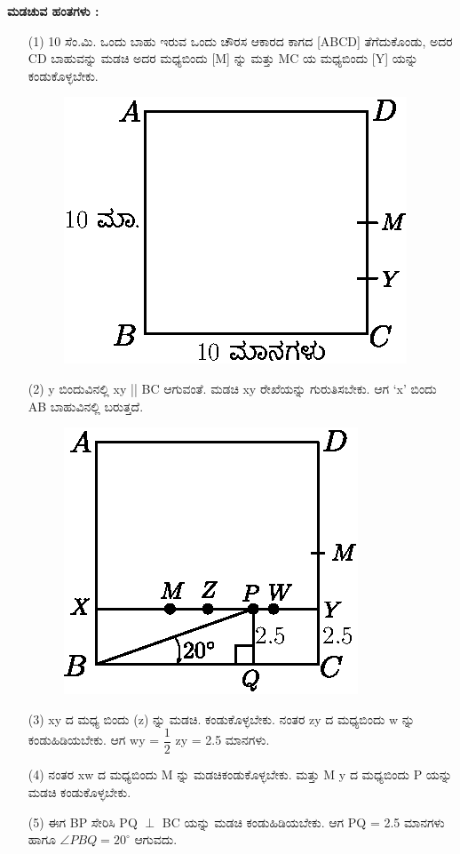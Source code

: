 \noindent
\textbf{ಮಡಚುವ ಹಂತಗಳು :}
\begin{enumerate}
\item[(1)] 10 ಸೆಂ.ಮಿ. ಒಂದು ಬಾಹು ಇರುವ ಒಂದು ಚೌರಸ ಆಕಾರದ ಕಾಗದ  [ABCD] ತೆಗೆದುಕೊಂಡು, ಅದರ CD ಬಾಹುವನ್ನು ಮಡಚಿ ಅದರ ಮಧ್ಯಬಿಂದು [M] ನ್ನು ಮತ್ತು MC ಯ ಮಧ್ಯಬಿಂದು [Y] ಯನ್ನು ಕಂಡುಕೊಳ್ಳಬೇಕು. 
\begin{figure}[H]
\centering
\includegraphics[scale=.9]{src/figure/chap1/fig1-14a.eps}
\end{figure}

\item[(2)] y ಬಿಂದುವಿನಲ್ಲಿ  xy || BC ಆಗುವಂತೆ. ಮಡಚಿ xy ರೇಖೆಯನ್ನು ಗುರುತಿಸಬೇಕು. ಆಗ `x' ಬಿಂದು AB ಬಾಹುವಿನಲ್ಲಿ ಬರುತ್ತದೆ. 
\begin{figure}[H]
\centering
\includegraphics[scale=.9]{src/figure/chap1/fig1-14b.eps}
\end{figure}

\item[(3)] xy ದ ಮಧ್ಯ ಬಿಂದು (z) ನ್ನು ಮಡಚಿ. ಕಂಡುಕೊಳ್ಳಬೇಕು. ನಂತರ zy ದ ಮಧ್ಯಬಿಂದು w ನ್ನು ಕಂಡುಹಿಡಿಯಬೇಕು. ಆಗ wy = $\dfrac{1}{2}$ zy = 2.5 ಮಾನಗಳು.

\item[(4)] ನಂತರ xw ದ ಮಧ್ಯಬಿಂದು M ನ್ನು ಮಡಚಿಕಂಡುಕೊಳ್ಳಬೇಕು. ಮತ್ತು M y ದ ಮಧ್ಯಬಿಂದು  P ಯನ್ನು ಮಡಚಿ ಕಂಡುಕೊಳ್ಳಬೇಕು.

\item[(5)] ಈಗ BP ಸೇರಿಸಿ PQ $\perp$ BC ಯನ್ನು ಮಡಚಿ ಕಂಡುಹಿಡಿಯಬೇಕು. ಆಗ PQ = 2.5 ಮಾನಗಳು ಹಾಗೂ  $\angle PBQ = 20^\circ$ ಆಗುವದು.  
\end{enumerate}

